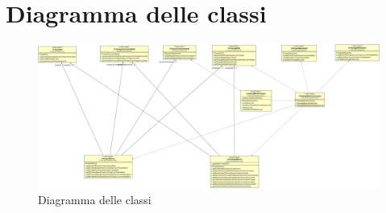 \chapter{Diagramma delle classi}
\begin{figure}[ht]
	\centering
	\includegraphics[width=1.1\textwidth, angle=90]{img/classDiagram.png}
	\caption{Diagramma delle classi}
\end{figure}